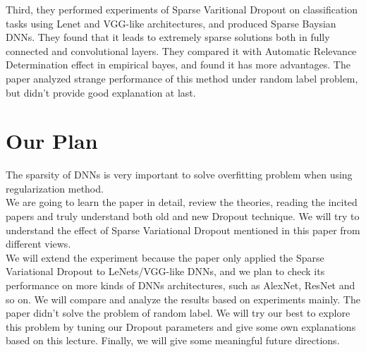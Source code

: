 \documentclass{article}
\begin{document}
		Third, they performed experiments of Sparse Varitional Dropout on classification tasks using Lenet and VGG-like architectures, and produced Sparse Baysian DNNs. They found that it leads to extremely sparse solutions both in fully connected and convolutional layers. They compared it with Automatic Relevance Determination effect in empirical bayes, and found it has more advantages. The paper analyzed strange performance of this method under random label problem, but didn’t provide good explanation at last.\\
	    
	\section{Our Plan}
		The sparsity of DNNs is very important to solve overfitting problem when using regularization method.\\
		We are going to learn the paper in detail, review the theories, reading the incited papers\cite{frankle2018lottery} \cite{gale2019state} and truly understand both old and new Dropout technique. We will try to understand the effect of Sparse Variational Dropout mentioned in this paper from different views.\\
		We will extend the experiment because the paper only applied the Sparse Variational Dropout to LeNets/VGG-like DNNs, and we plan to check its performance on more kinds of DNNs architectures, such as AlexNet, ResNet and so on. We will compare and analyze the results based on experiments mainly. The paper didn’t solve the problem of random label. We will try our best to explore this problem by tuning our Dropout parameters and give some own explanations based on this lecture. Finally, we will give some meaningful future directions.\\



\end{document}
